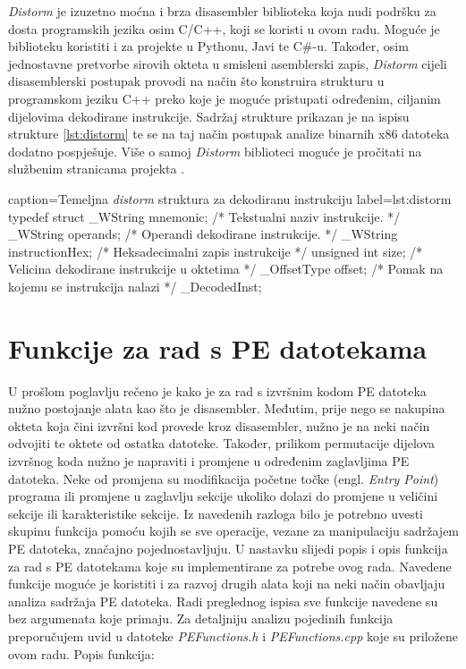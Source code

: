 \documentclass[times, utf8, diplomski, numeric]{fer}
\begin{document}
\emph{Distorm} je izuzetno moćna i brza disasembler biblioteka
koja nudi podršku za dosta programskih jezika osim C/C++, koji
se koristi u ovom radu. Moguće		%
je biblioteku koristiti i za projekte u Pythonu, Javi te C\#-u.
Također, osim jednostavne pretvorbe sirovih okteta u smisleni
asemblerski zapis, \emph{Distorm} cijeli disasemblerski postupak			%
provodi na način što konstruira strukturu u programskom jeziku
C++ preko koje je moguće pristupati određenim, ciljanim
dijelovima dekodirane instrukcije. Sadržaj strukture prikazan je
na ispisu strukture \ref{lst:distorm} te se na taj način postupak
analize binarnih x86 datoteka dodatno pospješuje. Više o samoj
\emph{Distorm} biblioteci moguće je pročitati na službenim
stranicama projekta \citep{distorm}. 						%

\begin{struktura} {caption=Temeljna \emph{distorm} struktura za dekodiranu instrukciju} {label=lst:distorm}
typedef struct {
	_WString mnemonic; /* Tekstualni naziv instrukcije. */
	_WString operands; /* Operandi dekodirane instrukcije. */
	_WString instructionHex; /* Heksadecimalni zapis instrukcije */
	unsigned int size; /* Velicina dekodirane instrukcije u oktetima */
	_OffsetType offset; /* Pomak na kojemu se instrukcija nalazi */
} _DecodedInst;
\end{struktura}

\section{Funkcije za rad s PE datotekama}

U prošlom poglavlju rečeno je kako je za rad s izvršnim kodom PE
datoteka nužno postojanje alata kao što je disasembler. Međutim,
prije nego se nakupina okteta koja čini izvršni kod provede kroz
disasembler, nužno je na neki način odvojiti te oktete od ostatka
datoteke. Također, prilikom permutacije dijelova izvršnog koda
nužno je napraviti i promjene u određenim zaglavljima PE
datoteka. Neke od promjena su modifikacija početne točke (engl. 
\emph{Entry Point}) programa ili promjene u zaglavlju sekcije
ukoliko dolazi do promjene u veličini sekcije ili karakteristike
sekcije. Iz navedenih razloga bilo je potrebno uvesti skupinu
funkcija pomoću kojih se sve operacije, vezane za manipulaciju
sadržajem PE datoteka, značajno pojednostavljuju. U nastavku
slijedi popis i opis funkcija za rad s PE datotekama koje su
implementirane za potrebe ovog rada. Navedene funkcije moguće je
koristiti i za razvoj drugih alata koji na neki način obavljaju
analiza sadržaja PE datoteka. Radi preglednog ispisa sve funkcije
navedene su bez argumenata koje primaju. Za detaljniju analizu
pojedinih funkcija preporučujem uvid u datoteke
\emph{PEFunctions.h} i \emph{PEFunctions.cpp} koje su priložene
ovom radu. Popis funkcija:
\end{document}
